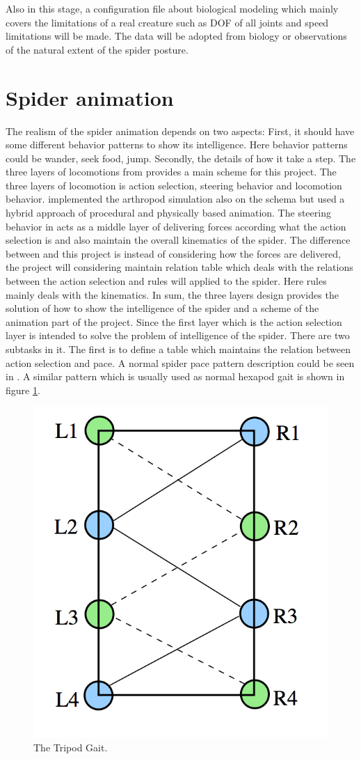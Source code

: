 Also in this stage, a configuration file about biological modeling which mainly covers the limitations of a real creature such as DOF of all joints and speed limitations will be made. The data will be adopted from biology or observations of the natural extent of the spider posture.
\section{Spider animation}
The realism of the spider animation depends on two aspects: First, it should have some different behavior patterns to show its intelligence. Here behavior patterns could be wander, seek food, jump. Secondly, the details of how it take a step.
The three layers of locomotions from \cite{steering} provides a main scheme for this project. The three layers of locomotion is action selection, steering behavior and locomotion behavior. \cite{thesis} implemented the arthropod simulation also on the schema but used a hybrid approach of procedural and physically based animation. The steering behavior in \cite{thesis} acts as a middle layer of delivering forces according what the action selection is and also maintain the overall kinematics of the spider. The difference between \cite{thesis} and this project is instead of considering how the forces are delivered, the project will considering maintain relation table which deals with the relations between the action selection and rules will applied to the spider. Here rules mainly deals with the kinematics. In sum, the three layers design provides the solution of how to show the intelligence of the spider and a scheme of the animation part of the project.
Since the first layer which is the action selection layer is intended to solve the problem of intelligence of the spider. There are two subtasks in it. The first is to define a table which maintains the relation between action selection and pace. A normal spider pace pattern description could be seen in \cite{arsimu2}. A similar pattern which is usually used as normal hexapod gait is shown in figure \ref{fig:triGait}.
 \begin{figure}[ht!]
\centering
\includegraphics[height=6 cm]{figures/triGait.png}
\caption{The Tripod Gait. \protect\cite{thesis}}
\label{fig:triGait}
\end{figure}
